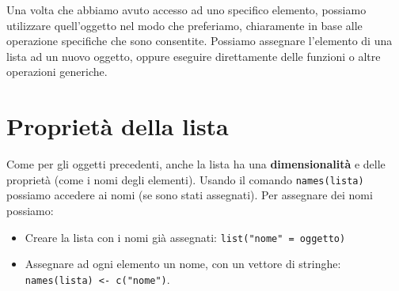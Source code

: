 \documentclass[
]{book}
\newenvironment{Shaded}{\begin{snugshade}}{\end{snugshade}}
\newcommand{\CommentTok}[1]{\textcolor[rgb]{0.56,0.35,0.01}{\textit{#1}}}
\newcommand{\DecValTok}[1]{\textcolor[rgb]{0.00,0.00,0.81}{#1}}
\newcommand{\NormalTok}[1]{#1}
\newcommand{\OperatorTok}[1]{\textcolor[rgb]{0.81,0.36,0.00}{\textbf{#1}}}
\newcommand{\StringTok}[1]{\textcolor[rgb]{0.31,0.60,0.02}{#1}}
\providecommand{\tightlist}{%
  \setlength{\itemsep}{0pt}\setlength{\parskip}{0pt}}
\begin{document}
Una volta che abbiamo avuto accesso ad uno specifico elemento, possiamo utilizzare quell'oggetto nel modo che preferiamo, chiaramente in base alle operazione specifiche che sono consentite. Possiamo assegnare l'elemento di una lista ad un nuovo oggetto, oppure eseguire direttamente delle funzioni o altre operazioni generiche.

\begin{Shaded}
\end{Shaded}

\hypertarget{proprietuxe0-della-lista}{%
\section{Proprietà della lista}\label{proprietuxe0-della-lista}}

Come per gli oggetti precedenti, anche la lista ha una \textbf{dimensionalità} e delle proprietà (come i nomi degli elementi). Usando il comando \texttt{names(lista)} possiamo accedere ai nomi (se sono stati assegnati). Per assegnare dei nomi possiamo:

\begin{itemize}
\tightlist
\item
  Creare la lista con i nomi già assegnati: \texttt{list("nome"\ =\ oggetto)}
\item
  Assegnare ad ogni elemento un nome, con un vettore di stringhe: \texttt{names(lista)\ \textless{}-\ c("nome")}.
\end{itemize}
\end{document}
